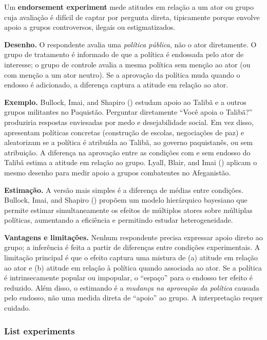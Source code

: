 \documentclass[
]{article}
\begin{document}
Um \textbf{endorsement experiment} mede atitudes em relação a um ator ou grupo cuja avaliação é difícil de captar por pergunta direta, tipicamente porque envolve apoio a grupos controversos, ilegais ou estigmatizados.

\textbf{Desenho.} O respondente avalia uma \emph{política pública}, não o ator diretamente. O grupo de tratamento é informado de que a política é endossada pelo ator de interesse; o grupo de controle avalia a mesma política sem menção ao ator (ou com menção a um ator neutro). Se a aprovação da política muda quando o endosso é adicionado, a diferença captura a atitude em relação ao ator.

\textbf{Exemplo.} Bullock, Imai, and Shapiro () estudam apoio ao Talibã e a outros grupos militantes no Paquistão. Perguntar diretamente ``Você apoia o Talibã?'' produziria respostas enviesadas por medo e desejabilidade social. Em vez disso, apresentam políticas concretas (construção de escolas, negociações de paz) e aleatorizam se a política é atribuída ao Talibã, ao governo paquistanês, ou sem atribuição. A diferença na aprovação entre as condições com e sem endosso do Talibã estima a atitude em relação ao grupo. Lyall, Blair, and Imai () aplicam o mesmo desenho para medir apoio a grupos combatentes no Afeganistão.

\textbf{Estimação.} A versão mais simples é a diferença de médias entre condições. Bullock, Imai, and Shapiro () propõem um modelo hierárquico bayesiano que permite estimar simultaneamente os efeitos de múltiplos atores sobre múltiplas políticas, aumentando a eficiência e permitindo estudar heterogeneidade.

\textbf{Vantagens e limitações.} Nenhum respondente precisa expressar apoio direto ao grupo; a inferência é feita a partir de diferenças entre condições experimentais. A limitação principal é que o efeito captura uma mistura de (a) atitude em relação ao ator e (b) atitude em relação à política quando associada ao ator. Se a política é intrinsecamente popular ou impopular, o ``espaço'' para o endosso ter efeito é reduzido. Além disso, o estimando é a \emph{mudança na aprovação da política} causada pelo endosso, não uma medida direta de ``apoio'' ao grupo. A interpretação requer cuidado.

\subsubsection{List experiments}\label{list-experiments}
\end{document}
